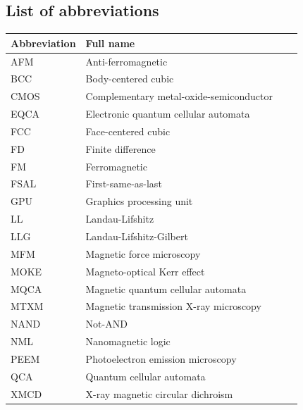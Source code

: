 \documentclass[11pt,a4paper,english]{article}
\begin{document}
\subsection*{List of abbreviations}
\begin{longtable}{llll}
\toprule
\bfseries Abbreviation & \bfseries Full name \\\midrule\endhead
AFM & Anti-ferromagnetic \\
BCC & Body-centered cubic \\
CMOS & Complementary metal-oxide-semiconductor \\
EQCA & Electronic quantum cellular automata \\
FCC & Face-centered cubic \\
FD & Finite difference \\
FM & Ferromagnetic \\
FSAL & First-same-as-last \\
GPU & Graphics processing unit \\
LL & Landau-Lifshitz \\
LLG & Landau-Lifshitz-Gilbert \\
MFM & Magnetic force microscopy \\
MOKE & Magneto-optical Kerr effect \\
MQCA & Magnetic quantum cellular automata \\
MTXM & Magnetic transmission X-ray microscopy \\
NAND & Not-AND \\ %
NML & Nanomagnetic logic \\
PEEM & Photoelectron emission microscopy \\
QCA & Quantum cellular automata \\
XMCD & X-ray magnetic circular dichroism \\
\bottomrule
\end{longtable}
\end{document}
